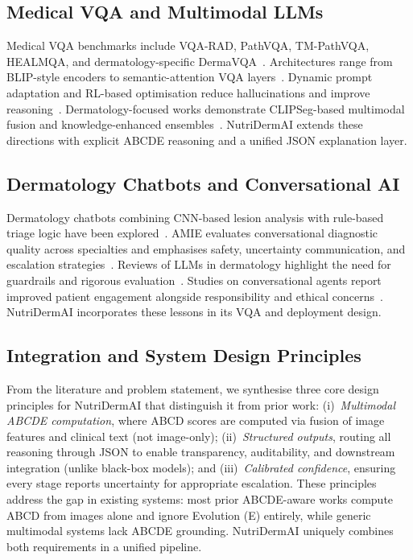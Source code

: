 \documentclass[conference]{IEEEtran}
\begin{document}
\subsection{Medical VQA and Multimodal LLMs}

Medical VQA benchmarks include VQA-RAD, PathVQA, TM-PathVQA, HEALMQA,
and dermatology-specific DermaVQA~\cite{lau2018_vqarad,he2020_pathvqa,
rajkhowa2024_tmpathvqa,yim2024_dermavqa,healmqa2024}. Architectures
range from BLIP-style encoders to semantic-attention VQA
layers~\cite{biomedblip2024_naseem,li2022_semantic_vqa}. Dynamic
prompt adaptation and RL-based optimisation reduce hallucinations and
improve reasoning~\cite{dsap2024_dynamic_prompting,medvlmr12025,
rlvalidation2023_vqa,medthink2025,madavan2025_medgrim}.
Dermatology-focused works demonstrate CLIPSeg-based multimodal fusion
and knowledge-enhanced
ensembles~\cite{faggioli2025_multimodal_sls_vqa,irel2025_clipseg,
h3n1lab2025_dermkem,lozano2025_synth_vqa,sviridov2025_multiagent_dialogue}.
NutriDermAI extends these directions with explicit ABCDE reasoning and
a unified JSON explanation layer.

\subsection{Dermatology Chatbots and Conversational AI}

Dermatology chatbots combining CNN-based lesion analysis with
rule-based triage logic have been
explored~\cite{dermatologychatbot2024,casestudy2024_wizard_of_oz}.
AMIE evaluates conversational diagnostic quality across specialties and
emphasises safety, uncertainty communication, and escalation
strategies~\cite{amie2025}. Reviews of LLMs in dermatology highlight
the need for guardrails and rigorous
evaluation~\cite{chatgptderm2025,medicalmmllmreview2024}. Studies on
conversational agents report improved patient engagement alongside
responsibility and ethical
concerns~\cite{convagents2025_effectiveness}. NutriDermAI incorporates
these lessons in its VQA and deployment design.

\subsection{Integration and System Design Principles}

From the literature and problem statement, we synthesise three core design
principles for NutriDermAI that distinguish it from prior work: 
(i)~\emph{Multimodal ABCDE computation}, where ABCD scores are computed
via fusion of image features and clinical text (not image-only);
(ii)~\emph{Structured outputs}, routing all reasoning through JSON to enable
transparency, auditability, and downstream integration (unlike black-box
models); and (iii)~\emph{Calibrated confidence}, ensuring every stage reports
uncertainty for appropriate escalation. These principles address the gap in
existing systems: most prior ABCDE-aware works compute ABCD from images alone
and ignore Evolution (E) entirely, while generic multimodal systems lack ABCDE
grounding. NutriDermAI uniquely combines both requirements in a unified
pipeline.
\end{document}
